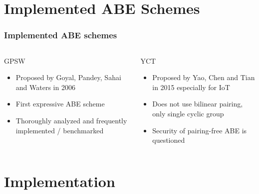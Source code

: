 \section{Implemented ABE Schemes}
\begin{frame}
    \frametitle{Implemented ABE schemes}
    \vspace{2.5cm}
    \begin{columns}[t]\centering
        \begin{block}{\centering GPSW}
            \centering
            \begin{itemize}
                \item Proposed by Goyal, Pandey, Sahai and Waters in 2006
                \item First expressive ABE scheme
                \item Thoroughly analyzed and frequently implemented / benchmarked
            \end{itemize}
        \end{block}

        \begin{block}{\centering YCT}
            \centering
            \begin{itemize}
                \item Proposed by Yao, Chen and Tian in 2015 especially for IoT
                \item Does not use bilinear pairing, only single cyclic group
                \item Security of pairing-free ABE is questioned
            \end{itemize}
        \end{block}
        
    \end{columns}
\end{frame}


\section{Implementation}

